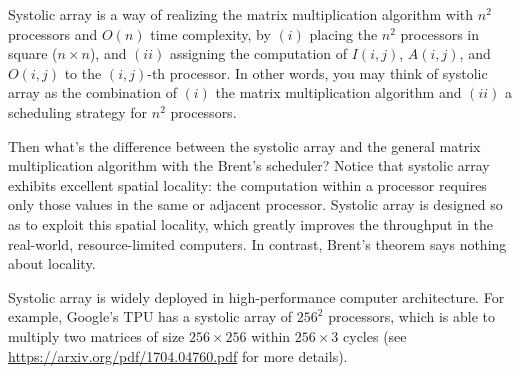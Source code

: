 \documentclass[11pt,a4paper,oneside,microtype,nokorean]{oblivoir}
\begin{document}
Systolic array is a way of realizing the matrix multiplication algorithm with $n^2$ processors and
$O(n)$ time complexity, by $(i)$ placing the $n^2$ processors in square ($n \times n$), and $(ii)$
assigning the computation of $I(i,j)$, $A(i,j)$, and $O(i,j)$ to the $(i,j)$-th processor.  In other
words, you may think of systolic array as the combination of $(i)$ the matrix multiplication
algorithm and $(ii)$ a scheduling strategy for $n^2$ processors.

Then what's the difference between the systolic array and the general matrix multiplication
algorithm with the Brent's scheduler?  Notice that systolic array exhibits excellent spatial
locality: the computation within a processor requires only those values in the same or adjacent
processor.  Systolic array is designed so as to exploit this spatial locality, which greatly
improves the throughput in the real-world, resource-limited computers.  In contrast, Brent's theorem
says nothing about locality.

Systolic array is widely deployed in high-performance computer architecture.  For example, Google's
TPU has a systolic array of ${256}^2$ processors, which is able to multiply two matrices of size
$256 \times 256$ within $256 \times 3$ cycles (see \url{https://arxiv.org/pdf/1704.04760.pdf} for
more details).
\end{document}
